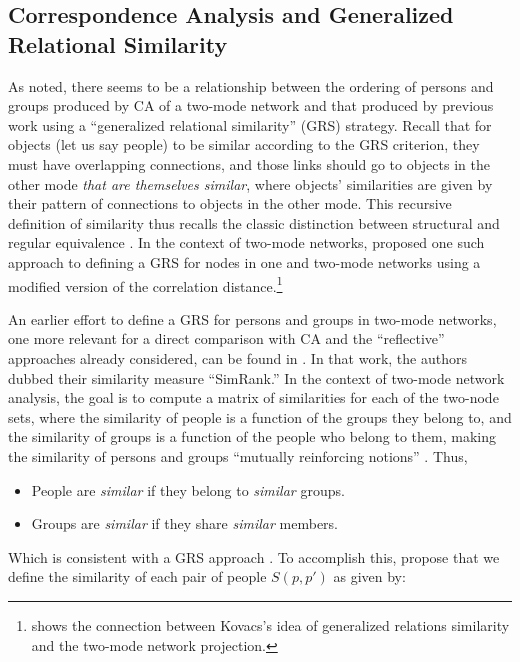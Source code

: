 \documentclass[a4paper,fleqn]{cas-sc}
\begin{document}
\subsection{Correspondence Analysis and Generalized Relational Similarity} \label{subsec:cagensim}
As noted, there seems to be a relationship between the ordering of persons and groups produced by CA of a two-mode network and that produced by previous work using a ``generalized relational similarity'' (GRS) strategy. Recall that for objects (let us say people) to be similar according to the GRS criterion, they must have overlapping connections, and those links should go to objects in the other mode \textit{that are themselves similar}, where objects' similarities are given by their pattern of connections to objects in the other mode. This recursive definition of similarity thus recalls the classic distinction between structural and regular equivalence \citep{everett1994regular}. In the context of two-mode networks, \citet{kovacs2010generalized} proposed one such approach to defining a GRS for nodes in one and two-mode networks using a modified version of the correlation distance.\footnote{\citet{lizardo2024two} shows the connection between Kovacs's idea of generalized relations similarity and the two-mode network projection.}

An earlier effort to define a GRS for persons and groups in two-mode networks, one more relevant for a direct comparison with CA and the ``reflective'' approaches already considered, can be found in \citet{jeh2002simrank}. In that work, the authors dubbed their similarity measure ``SimRank.'' In the context of two-mode network analysis, the goal is to compute a matrix of similarities for each of the two-node sets, where the similarity of people is a function of the groups they belong to, and the similarity of groups is a function of the people who belong to them, making the similarity of persons and groups ``mutually reinforcing notions'' \citep[540]{jeh2002simrank}. Thus,

\begin{itemize}
    \item People are \textit{similar} if they belong to \textit{similar} groups.
    \item Groups are \textit{similar} if they share \textit{similar} members.
\end{itemize}

Which is consistent with a GRS approach \citep[see][]{kovacs2010generalized, lizardo2024two}. To accomplish this, \citet[540, eq. 2 and eq. 3]{jeh2002simrank} propose that we define the similarity of each pair of people $S(p, p')$  as given by:
\end{document}
